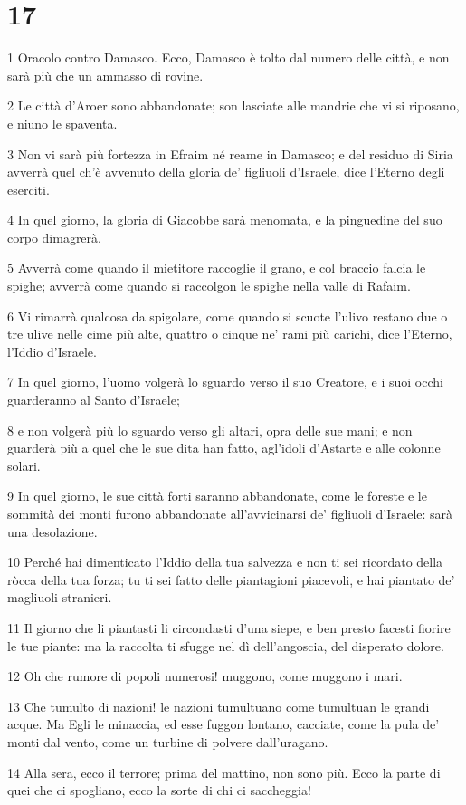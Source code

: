 \chapter{17}

\par 1 Oracolo contro Damasco. Ecco, Damasco è tolto dal numero delle città, e non sarà più che un ammasso di rovine.
\par 2 Le città d'Aroer sono abbandonate; son lasciate alle mandrie che vi si riposano, e niuno le spaventa.
\par 3 Non vi sarà più fortezza in Efraim né reame in Damasco; e del residuo di Siria avverrà quel ch'è avvenuto della gloria de' figliuoli d'Israele, dice l'Eterno degli eserciti.
\par 4 In quel giorno, la gloria di Giacobbe sarà menomata, e la pinguedine del suo corpo dimagrerà.
\par 5 Avverrà come quando il mietitore raccoglie il grano, e col braccio falcia le spighe; avverrà come quando si raccolgon le spighe nella valle di Rafaim.
\par 6 Vi rimarrà qualcosa da spigolare, come quando si scuote l'ulivo restano due o tre ulive nelle cime più alte, quattro o cinque ne' rami più carichi, dice l'Eterno, l'Iddio d'Israele.
\par 7 In quel giorno, l'uomo volgerà lo sguardo verso il suo Creatore, e i suoi occhi guarderanno al Santo d'Israele;
\par 8 e non volgerà più lo sguardo verso gli altari, opra delle sue mani; e non guarderà più a quel che le sue dita han fatto, agl'idoli d'Astarte e alle colonne solari.
\par 9 In quel giorno, le sue città forti saranno abbandonate, come le foreste e le sommità dei monti furono abbandonate all'avvicinarsi de' figliuoli d'Israele: sarà una desolazione.
\par 10 Perché hai dimenticato l'Iddio della tua salvezza e non ti sei ricordato della ròcca della tua forza; tu ti sei fatto delle piantagioni piacevoli, e hai piantato de' magliuoli stranieri.
\par 11 Il giorno che li piantasti li circondasti d'una siepe, e ben presto facesti fiorire le tue piante: ma la raccolta ti sfugge nel dì dell'angoscia, del disperato dolore.
\par 12 Oh che rumore di popoli numerosi! muggono, come muggono i mari.
\par 13 Che tumulto di nazioni! le nazioni tumultuano come tumultuan le grandi acque. Ma Egli le minaccia, ed esse fuggon lontano, cacciate, come la pula de' monti dal vento, come un turbine di polvere dall'uragano.
\par 14 Alla sera, ecco il terrore; prima del mattino, non sono più. Ecco la parte di quei che ci spogliano, ecco la sorte di chi ci saccheggia!

